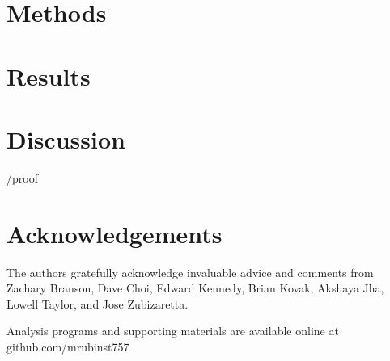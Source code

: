 \documentclass[aoas]{imsart}
\theoremstyle{plain}
\theoremstyle{remark}
\begin{document}
\section{Methods}\label{sec:methods}


\section{Results}


\section{Discussion}


\begin{appendix}

{/proof}









\end{appendix}

\section*{Acknowledgements}

The authors gratefully acknowledge invaluable advice and comments from Zachary Branson, Dave Choi, Edward Kennedy, Brian Kovak, Akshaya Jha, Lowell Taylor, and Jose Zubizaretta.

\begin{supplement}
Analysis programs and supporting materials are available online at github.com/mrubinst757
\end{supplement}

\end{document}
